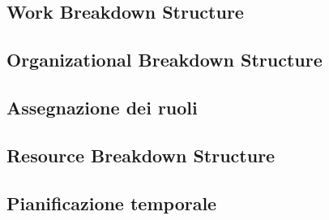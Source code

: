 \subsection{Work Breakdown Structure}

\newpage

\subsection{Organizational Breakdown Structure}

\newpage

\subsection{Assegnazione dei ruoli}

\newpage

\subsection{Resource Breakdown Structure}

\newpage

\subsection{Pianificazione temporale}

\newpage